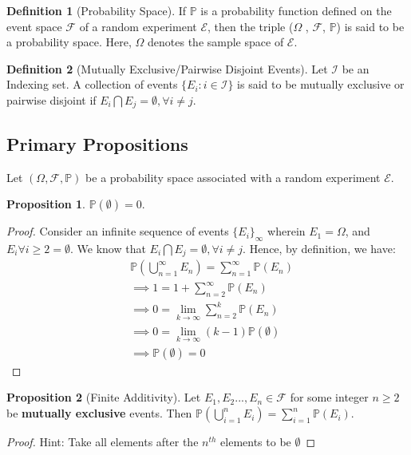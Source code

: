 \documentclass[11pt]{article}
\theoremstyle{definition}
\newtheorem{defn}{Definition}
\newtheorem{prop}{Proposition}[section]
\begin{document}
\begin{defn}[Probability Space]
If $\mathbb{P}$ is a probability function defined on the event space $\mathcal{F}$ of a random experiment $\mathcal{E}$, then the triple ($\Omega$ , $\mathcal{F}$, $\mathbb{P}$) is said to be a probability space. Here, $\Omega$ denotes the sample space of $\mathcal{E}$.
\end{defn}

\begin{defn}[Mutually Exclusive/Pairwise Disjoint Events]
Let $\mathcal{I}$ be an Indexing set. A collection of events $\{E_i: i \in \mathcal{I}\}$ is said to be mutually exclusive or pairwise disjoint if $E_i \bigcap E_j = \emptyset, \forall i \neq j$.
\end{defn}

\subsection{Primary Propositions}

Let $(\Omega, \mathcal{F}, \mathbb{P})$ be a probability space associated with a random experiment $\mathcal{E}$.

\begin{prop}
$\mathbb{P}(\emptyset) = 0$.
\end{prop}
\begin{proof}
Consider an infinite sequence of events $\{E_i\}_\infty$ wherein $E_1 = \Omega$, and $E_i \forall i \geq 2 = \emptyset$. We know that $E_i \bigcap E_j = \emptyset , \forall i \neq j$. Hence, by definition, we have:
\begin{align*}
&\mathbb{P} (\bigcup_{n=1}^{\infty} E_n) = \sum_{n = 1}^{\infty} \mathbb{P}(E_n) \\
&\implies 1 = 1+\sum_{n = 2}^{\infty} \mathbb{P}(E_n) \\
&\implies 0 = \lim_{k \rightarrow \infty} \sum_{n = 2}^{k} \mathbb{P}(E_n) \\
&\implies 0 = \lim_{k \rightarrow \infty} (k-1) \mathbb{P}(\emptyset) \\
&\implies \mathbb{P}(\emptyset) = 0
\end{align*}
\end{proof}

\begin{prop}[Finite Additivity]
Let $E_1, E_2 ... , E_n \in \mathcal{F}$ for some integer $n \geq 2$ be \textbf{mutually exclusive} events. Then $\mathbb{P} (\bigcup_{i=1}^n E_i) = \sum_{i = 1}^n \mathbb{P}(E_i)$.
\end{prop}
\begin{proof}
Hint: Take all elements after the $n^{th}$ elements to be $\emptyset$
\end{proof}
\end{document}
